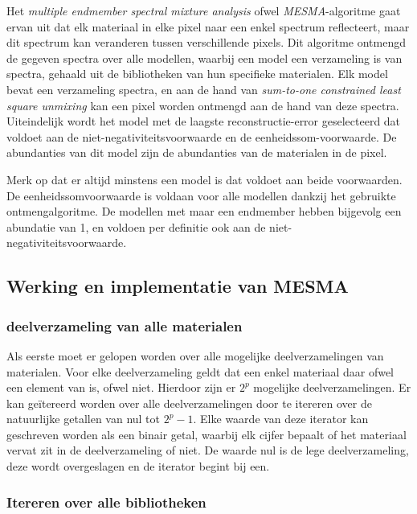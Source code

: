 \documentclass[12pt]{report}
\begin{document}
Het \textit{multiple endmember spectral mixture analysis} ofwel \textit{MESMA}-algoritme gaat ervan uit dat elk materiaal in elke pixel naar een enkel spectrum reflecteert, maar dit spectrum kan veranderen tussen verschillende pixels. Dit algoritme ontmengd de gegeven spectra over alle modellen, waarbij een model een verzameling is van spectra, gehaald uit de bibliotheken van hun specifieke materialen. Elk model bevat een verzameling spectra, en aan de hand van \textit{sum-to-one constrained least square unmixing} kan een pixel worden ontmengd aan de hand van deze spectra. Uiteindelijk wordt het model  met de laagste reconstructie-error geselecteerd dat voldoet aan de niet-negativiteitsvoorwaarde en de eenheidssom-voorwaarde. De abundanties van dit model zijn de abundanties van de materialen in de pixel.

Merk op dat er altijd minstens een model is dat voldoet aan beide voorwaarden. De eenheidssomvoorwaarde is voldaan voor alle modellen dankzij het gebruikte ontmengalgoritme. De modellen met maar een endmember hebben bijgevolg een abundatie van 1, en voldoen per definitie ook aan de niet-negativiteitsvoorwaarde.


\subsection{Werking en implementatie van MESMA}

\subsubsection{deelverzameling van alle materialen}

Als eerste moet er gelopen worden over alle mogelijke deelverzamelingen van materialen. Voor elke deelverzameling geldt dat een enkel materiaal daar ofwel een element van is, ofwel niet. Hierdoor zijn er $2^p$ mogelijke deelverzamelingen. Er kan ge\"itereerd worden over alle deelverzamelingen door te itereren over de natuurlijke getallen van nul tot $2^p-1$. Elke waarde van deze iterator kan geschreven worden als een binair getal, waarbij elk cijfer bepaalt of het materiaal vervat zit in de deelverzameling of niet. De waarde nul is de lege deelverzameling, deze wordt overgeslagen en de iterator begint bij een.

\subsubsection{Itereren over alle bibliotheken}
\end{document}

